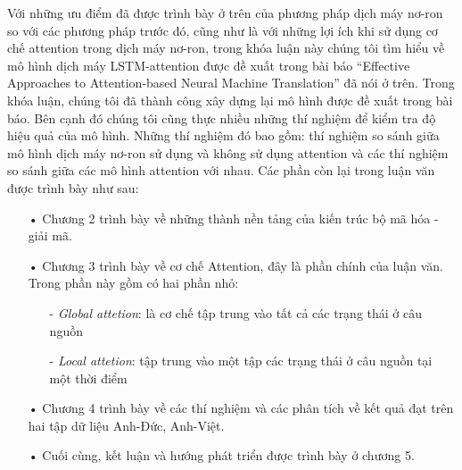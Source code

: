 Với những ưu điểm đã được trình bày ở trên của phương pháp dịch máy nơ-ron so với các phương pháp trước đó, cũng như là với những lợi ích khi sử dụng cơ chế attention trong dịch máy nơ-ron, trong khóa luận này chúng tôi tìm hiểu về mô hình dịch máy LSTM-attention được đề xuất trong bài báo “Effective Approaches to Attention-based Neural Machine Translation” \cite{attentionThangLuong2015} đã nói ở trên. Trong khóa luận, chúng tôi đã thành công xây dựng lại mô hình được đề xuất trong bài báo. Bên cạnh đó chúng tôi cũng thực nhiều những thí nghiệm để kiểm tra độ hiệu quả của mô hình. Những thí nghiệm đó bao gồm: thí nghiệm so sánh giữa mô hình dịch máy nơ-ron sử dụng và không sử dụng attention và các thí nghiệm so sánh giữa các mô hình attention với nhau. Các phần còn lại trong luận văn được trình bày như sau:
\begin{itemize}
	\item[•] Chương 2 trình bày về những thành nền tảng của kiến trúc bộ mã hóa - giải mã.
	
	\item[•] Chương 3 trình bày về cơ chế Attention, đây là phần chính của luận văn. Trong phần này gồm có hai phần nhỏ:
		\begin{itemize}
			\item[-] \textit{Global attetion}: là cơ chế tập trung vào tất cả các trạng thái ở câu nguồn
			\item[-] \textit{Local attetion}: tập trung vào một tập các trạng thái ở câu nguồn tại một thời điểm
		\end{itemize}
	\item[•] Chương 4 trình bày về các thí nghiệm và các phân tích về kết quả đạt trên hai tập dữ liệu Anh-Đức, Anh-Việt.
	\item[•] Cuối cùng, kết luận và hướng phát triển được trình bày ở chương 5.
\end{itemize}





